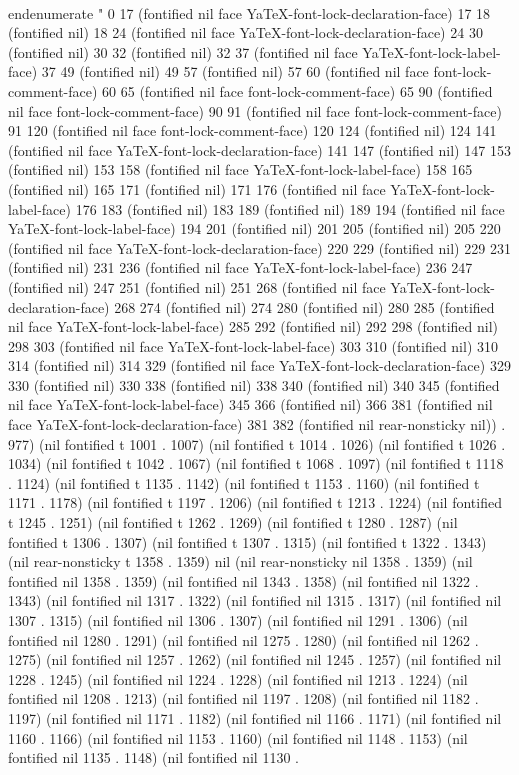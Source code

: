 {\\end{enumerate}
" 0 17 (fontified nil face YaTeX-font-lock-declaration-face) 17 18 (fontified nil) 18 24 (fontified nil face YaTeX-font-lock-declaration-face) 24 30 (fontified nil) 30 32 (fontified nil) 32 37 (fontified nil face YaTeX-font-lock-label-face) 37 49 (fontified nil) 49 57 (fontified nil) 57 60 (fontified nil face font-lock-comment-face) 60 65 (fontified nil face font-lock-comment-face) 65 90 (fontified nil face font-lock-comment-face) 90 91 (fontified nil face font-lock-comment-face) 91 120 (fontified nil face font-lock-comment-face) 120 124 (fontified nil) 124 141 (fontified nil face YaTeX-font-lock-declaration-face) 141 147 (fontified nil) 147 153 (fontified nil) 153 158 (fontified nil face YaTeX-font-lock-label-face) 158 165 (fontified nil) 165 171 (fontified nil) 171 176 (fontified nil face YaTeX-font-lock-label-face) 176 183 (fontified nil) 183 189 (fontified nil) 189 194 (fontified nil face YaTeX-font-lock-label-face) 194 201 (fontified nil) 201 205 (fontified nil) 205 220 (fontified nil face YaTeX-font-lock-declaration-face) 220 229 (fontified nil) 229 231 (fontified nil) 231 236 (fontified nil face YaTeX-font-lock-label-face) 236 247 (fontified nil) 247 251 (fontified nil) 251 268 (fontified nil face YaTeX-font-lock-declaration-face) 268 274 (fontified nil) 274 280 (fontified nil) 280 285 (fontified nil face YaTeX-font-lock-label-face) 285 292 (fontified nil) 292 298 (fontified nil) 298 303 (fontified nil face YaTeX-font-lock-label-face) 303 310 (fontified nil) 310 314 (fontified nil) 314 329 (fontified nil face YaTeX-font-lock-declaration-face) 329 330 (fontified nil) 330 338 (fontified nil) 338 340 (fontified nil) 340 345 (fontified nil face YaTeX-font-lock-label-face) 345 366 (fontified nil) 366 381 (fontified nil face YaTeX-font-lock-declaration-face) 381 382 (fontified nil rear-nonsticky nil)) . 977) (nil fontified t 1001 . 1007) (nil fontified t 1014 . 1026) (nil fontified t 1026 . 1034) (nil fontified t 1042 . 1067) (nil fontified t 1068 . 1097) (nil fontified t 1118 . 1124) (nil fontified t 1135 . 1142) (nil fontified t 1153 . 1160) (nil fontified t 1171 . 1178) (nil fontified t 1197 . 1206) (nil fontified t 1213 . 1224) (nil fontified t 1245 . 1251) (nil fontified t 1262 . 1269) (nil fontified t 1280 . 1287) (nil fontified t 1306 . 1307) (nil fontified t 1307 . 1315) (nil fontified t 1322 . 1343) (nil rear-nonsticky t 1358 . 1359) nil (nil rear-nonsticky nil 1358 . 1359) (nil fontified nil 1358 . 1359) (nil fontified nil 1343 . 1358) (nil fontified nil 1322 . 1343) (nil fontified nil 1317 . 1322) (nil fontified nil 1315 . 1317) (nil fontified nil 1307 . 1315) (nil fontified nil 1306 . 1307) (nil fontified nil 1291 . 1306) (nil fontified nil 1280 . 1291) (nil fontified nil 1275 . 1280) (nil fontified nil 1262 . 1275) (nil fontified nil 1257 . 1262) (nil fontified nil 1245 . 1257) (nil fontified nil 1228 . 1245) (nil fontified nil 1224 . 1228) (nil fontified nil 1213 . 1224) (nil fontified nil 1208 . 1213) (nil fontified nil 1197 . 1208) (nil fontified nil 1182 . 1197) (nil fontified nil 1171 . 1182) (nil fontified nil 1166 . 1171) (nil fontified nil 1160 . 1166) (nil fontified nil 1153 . 1160) (nil fontified nil 1148 . 1153) (nil fontified nil 1135 . 1148) (nil fontified nil 1130 . }
